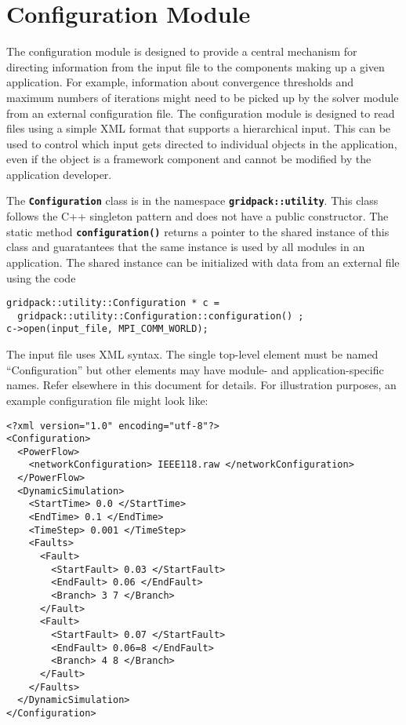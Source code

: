 \section{Configuration Module }\label{configuration}

The configuration module is designed to provide a central mechanism for directing information from the input file to the components making up a given application. For example, information about convergence thresholds and maximum numbers of iterations might need to be picked up by the solver module from an external configuration file. The configuration module is designed to read files using a simple XML format that supports a hierarchical input. This can be used to control which input gets directed to individual objects in the application, even if the object is a framework component and cannot be modified by the application developer.

The \texttt{\textbf{Configuration}} class is in the namespace \texttt{\textbf{gridpack::utility}}. This class follows the C++ singleton pattern and does not have a public constructor. The static method \texttt{\textbf{configuration()}} returns a pointer to the shared instance of this class and guaratantees that the same instance is used by all modules in an application. The shared instance can be initialized with data from an external file using the code

{
\color{red}
\begin{Verbatim}[fontseries=b]
gridpack::utility::Configuration * c = 
  gridpack::utility::Configuration::configuration() ; 
c->open(input_file, MPI_COMM_WORLD);
\end{Verbatim}
}

The input file uses XML syntax. The single top-level element must be named ``Configuration'' but other elements may have module- and application-specific names. Refer elsewhere in this document for details.  For illustration purposes, an example configuration file might look like: 

{
\color{blue}
\bfseries
\begin{Verbatim}[commandchars=\\\{\}]
<?xml version="1.0" encoding="utf-8"?>
<Configuration>
  <PowerFlow>
    <networkConfiguration> IEEE118.raw </networkConfiguration>
  </PowerFlow>
  <DynamicSimulation>
    <StartTime> 0.0 </StartTime>
    <EndTime> 0.1 </EndTime>
    <TimeStep> 0.001 </TimeStep>
    <Faults>
      <Fault>
        <StartFault> 0.03 </StartFault>
        <EndFault> 0.06 </EndFault>
        <Branch> 3 7 </Branch>
      </Fault>
      <Fault>
        <StartFault> 0.07 </StartFault>
        <EndFault> 0.06=8 </EndFault>
        <Branch> 4 8 </Branch>
      </Fault>
    </Faults>
  </DynamicSimulation>
</Configuration>
\end{Verbatim}
}

